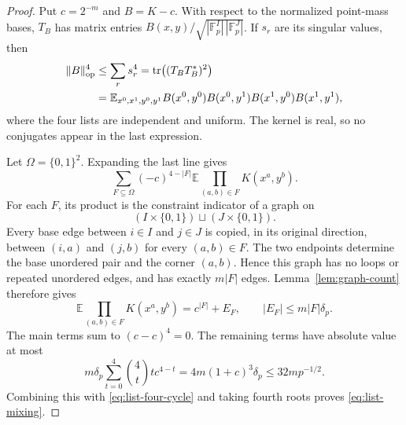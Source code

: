 \begin{proof}
Put \(c=2^{-m}\) and \(B=K-c\).  With respect to the normalized
point-mass bases, \(T_B\) has matrix entries
\(B(x,y)/\sqrt{|\mathbb F_p^I|\,|\mathbb F_p^J|}\).
If \(s_r\) are its singular values, then
\begin{align}
 \|B\|_{\mathrm{op}}^4
 &\le \sum_r s_r^4
 =\operatorname{tr}\bigl((T_BT_B^*)^2\bigr) \notag\\
 &=\mathbb E_{x^0,x^1,y^0,y^1}
 B(x^0,y^0)B(x^0,y^1)B(x^1,y^0)B(x^1,y^1),
 \label{eq:list-four-cycle}
\end{align}
where the four lists are independent and uniform.  The kernel is
real, so no conjugates appear in the last expression.

Let \(\Omega=\{0,1\}^2\).  Expanding the last line gives
\[
 \sum_{F\subseteq\Omega}(-c)^{4-|F|}
 \mathbb E\prod_{(a,b)\in F}K(x^a,y^b).
\]
For each \(F\), its product is the constraint indicator of a graph
on
\[
 (I\times\{0,1\})\sqcup(J\times\{0,1\}).
\]
Every base edge between \(i\in I\) and \(j\in J\) is copied, in its
original direction, between \((i,a)\) and \((j,b)\) for every
\((a,b)\in F\).  The two endpoints determine the base unordered
pair and the corner \((a,b)\).  Hence this graph has no loops or
repeated unordered edges, and has exactly \(m|F|\) edges.
Lemma~\ref{lem:graph-count} therefore gives
\[
 \mathbb E\prod_{(a,b)\in F}K(x^a,y^b)
 =c^{|F|}+E_F,
 \qquad |E_F|\le m|F|\delta_p.
\]
The main terms sum to \((c-c)^4=0\).  The remaining terms have
absolute value at most
\[
 m\delta_p\sum_{t=0}^4\binom4t t c^{4-t}
 =4m(1+c)^3\delta_p
 \le32m p^{-1/2}.
\]
Combining this with \eqref{eq:list-four-cycle} and taking fourth
roots proves \eqref{eq:list-mixing}.
\end{proof}

